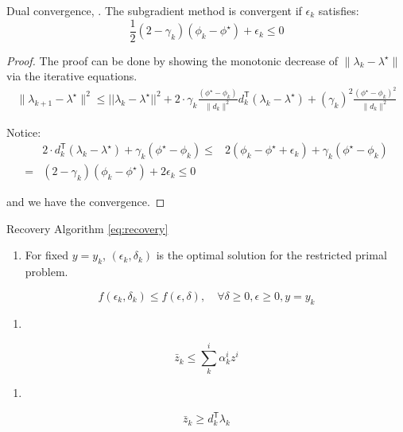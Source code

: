 \documentclass[../main]{subfiles}
\begin{document}
\begin{lemma} \label{lemma:dual_conv} Dual convergence, \cite{brannlund1995generalized}. The
  subgradient method is convergent if \(\epsilon_k\) satisfies:
  \begin{equation}
    \frac{1}{2}(2 - \gamma_k) (\phi_{k} - \phi^\star)  + \epsilon_k \le 0
  \end{equation}
\end{lemma}
\begin{proof}
  The proof can be done by showing the monotonic decrease of
  \(\|\lambda_{k} - \lambda^\star\|\) via the iterative equations.
  \begin{equation}\begin{aligned}
      \|\lambda_{k+1} - \lambda^\star\|^2 \le ||\lambda_k - \lambda^\star||^2
      + 2\cdot \gamma_k \frac{(\phi^\star - \phi_{k})}{\|d_{k}\|^{2}} d_k^\mathsf{T}(\lambda_k - \lambda^\star)
      + (\gamma_{k})^{2} \frac{(\phi^\star - \phi_{k})^{2}}{\|d_{k}\|^{2}}
    \end{aligned}\end{equation}

  Notice: \begin{equation}\begin{aligned}
          & 2  \cdot d_k^\mathsf{T}(\lambda_k - \lambda^\star) + \gamma_{k}(\phi^\star - \phi_{k})
      \le & 2 (\phi_{k} - \phi^\star + \epsilon_k) + \gamma_k(\phi^\star -\phi_k)                  \\
      =   & (2 - \gamma_k) (\phi_{k} - \phi^\star)  + 2\epsilon_k \le 0
    \end{aligned}\end{equation}

  and we have the convergence.
\end{proof}

\begin{theorem} \label{lemma:recovery}  Recovery Algorithm \eqref{eq:recovery}
  \begin{enumerate}
    \def\labelenumi{(\alph{enumi})}

    \item
          For fixed \(y=y_k\), \((\epsilon_k, \delta_k)\) is the optimal
          solution for the restricted primal problem.
  \end{enumerate}

  \[f(\epsilon_k, \delta_k) \le f(\epsilon, \delta), \quad \forall \delta\ge 0, \epsilon\ge 0, y= y_k\]

  \begin{enumerate}
    \def\labelenumi{(\alph{enumi})}
    \setcounter{enumi}{1}

    \item
  \end{enumerate}

  \[\bar z_k \le \sum^i_k \alpha^i_k z^i\]
  \begin{enumerate}
    \def\labelenumi{(\alph{enumi})}
    \setcounter{enumi}{2}

    \item
  \end{enumerate}
  \[\bar z_k \ge d_k^\mathsf{T} \lambda_k\]

\end{theorem}
\end{document}
